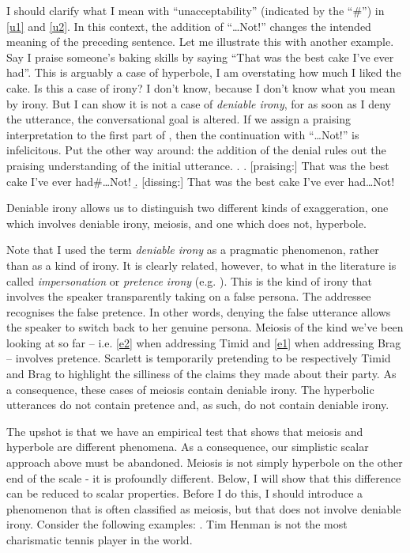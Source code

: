 \documentclass[a4paper,12pt,twoside]{article}
\begin{document}
I should clarify what I mean with ``unacceptability'' (indicated by the ``\#'') in \ref{u1} and \ref{u2}. In this context, the addition of ``\ldots{}Not!'' changes the intended meaning of the preceding sentence.
Let me illustrate this with another example. Say I praise someone's baking skills by saying ``That was the best cake I've ever had''. This is arguably a case of hyperbole, I am overstating how much I liked the cake. Is this a case of irony? I don't know, because I don't know what you mean by irony. But I can show it is not a case of \emph{deniable irony}, for as soon as I deny the utterance, the conversational goal is altered. If we assign a praising interpretation to the first part of \Next, then the continuation with ``\ldots{}Not!'' is infelicitous. Put the other way around: the addition of the denial rules out the praising understanding of the initial utterance.
\ex.
\a. [praising:] That was the best cake I've ever had\#\ldots{}Not!
\b. [dissing:]  That was the best cake I've ever had\ldots{}Not!



Deniable irony allows us to distinguish two different kinds of exaggeration, one which involves deniable irony, meiosis, and one which does not, hyperbole. 

Note that I used the term \emph{deniable irony} as a pragmatic phenomenon, rather than as a kind of irony. It is clearly related, however, to what in the literature is called \emph{impersonation} or \emph{pretence irony} (e.g. \citealt{currie06,simonin18}). This is the kind of irony that involves the speaker transparently taking on a false persona. The addressee recognises the false pretence. In other words, denying the false utterance allows the speaker to switch back to her genuine persona.
Meiosis of the kind we've been looking at so far -- i.e. \ref{e2} when addressing Timid and \ref{e1} when addressing Brag -- involves pretence. Scarlett is temporarily pretending to be respectively Timid and Brag to highlight the silliness of the claims they made about their party. As a consequence, these cases of meiosis contain deniable irony. The hyperbolic utterances do not contain pretence and, as such, do not contain deniable irony. 

The upshot is that we have an empirical test that shows that meiosis and hyperbole are different phenomena. As a consequence, our simplistic scalar approach above must be abandoned. Meiosis is not simply hyperbole on the other end of the scale - it is profoundly different. Below, I will show that this difference can be reduced to scalar properties.
Before I do this, I should introduce a phenomenon that is often classified as meiosis, but that does not involve deniable irony. Consider the following examples:
\ex.\label{henman} Tim Henman is not the most charismatic tennis player in the world. \citep{wilson16}
\end{document}
